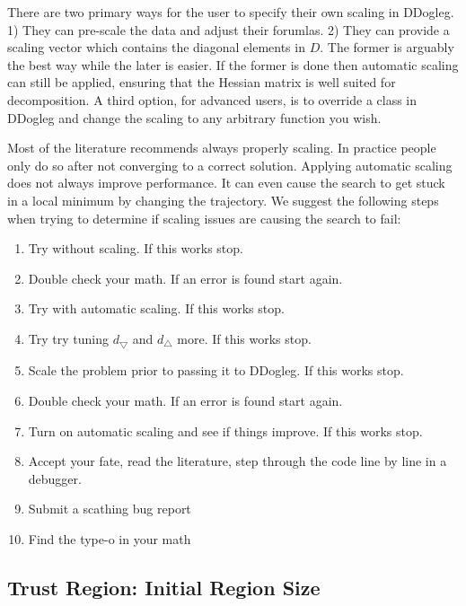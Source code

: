\documentclass[peerreview,onecolumn]{IEEEtran}
\begin{document}
There are two primary ways for the user to specify their own scaling in DDogleg. 1) They can pre-scale the data and adjust their forumlas. 2) They can provide a scaling vector which contains the diagonal elements in $D$. The former is arguably the best way while the later is easier. If the former is done then automatic scaling can still be applied, ensuring that the Hessian matrix is well suited for decomposition. A third option, for advanced users, is to override a class in DDogleg and change the scaling to any arbitrary function you wish.

Most of the literature recommends always properly scaling. In practice people only do so after not converging to a correct solution. Applying automatic scaling does not always improve performance. It can even cause the search to get stuck in a local minimum by changing the trajectory. We suggest the following steps when trying to determine if scaling issues are causing the search to fail:
\begin{center}
\begin{minipage}[c]{0.7\textwidth}
\begin{enumerate}
\item Try without scaling. If this works stop.
\item Double check your math. If an error is found start again.
\item Try with automatic scaling. If this works stop.
\item Try try tuning $d_{\bigtriangledown}$ and $d_{\bigtriangleup}$ more. If this works stop.
\item Scale the problem prior to passing it to DDogleg. If this works stop.
\item Double check your math. If an error is found start again.
\item Turn on automatic scaling and see if things improve. If this works stop.
\item Accept your fate, read the literature, step through the code line by line in a debugger.
\item Submit a scathing bug report
\item Find the type-o in your math
\end{enumerate}
\end{minipage}
\end{center}

\subsection{Trust Region: Initial Region Size} 
\label{section:init_region_size}
\end{document}
